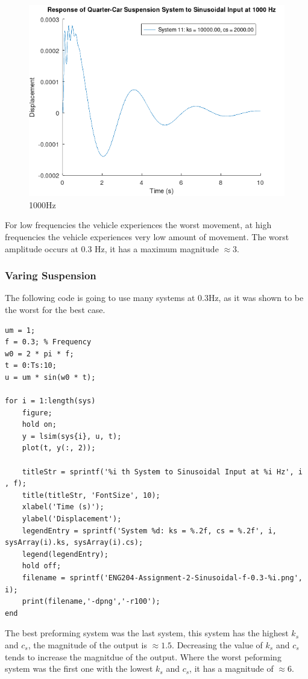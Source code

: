 \documentclass[11pt]{article}
\begin{document}
\begin{figure}[h]
    \centering
    \includegraphics[width=.9\linewidth]{ENG204-Assignment-2-Sinusoidal-f-1000.png}
    \caption{1000Hz}
    \label{fig:1000hz}
\end{figure}

For low frequencies the vehicle experiences the worst movement, at high frequencies the vehicle experiences very low amount of movement. The worst amplitude occurs at 0.3 Hz, it has a maximum magnitude \(\approx 3\).
\subsubsection{Varing Suspension}
\label{sec:org70c3b0a}
The following code is going to use many systems at 0.3Hz, as it was shown to be the worst for the best case.
\begin{verbatim}
um = 1;
f = 0.3; % Frequency
w0 = 2 * pi * f;
t = 0:Ts:10;
u = um * sin(w0 * t);

for i = 1:length(sys)
    figure;
    hold on;
    y = lsim(sys{i}, u, t);
    plot(t, y(:, 2));

    titleStr = sprintf('%i th System to Sinusoidal Input at %i Hz', i , f);
    title(titleStr, 'FontSize', 10);
    xlabel('Time (s)');
    ylabel('Displacement');
    legendEntry = sprintf('System %d: ks = %.2f, cs = %.2f', i, sysArray(i).ks, sysArray(i).cs);
    legend(legendEntry);
    hold off;
    filename = sprintf('ENG204-Assignment-2-Sinusoidal-f-0.3-%i.png', i);
    print(filename,'-dpng','-r100');
end
\end{verbatim}

The best preforming system was the last system, this system has the highest \(k_s\) and \(c_s\), the magnitude of the output is \(\approx 1.5\). Decreasing the value of \(k_s\) and \(c_s\) tends to increase the magnitdue of the output. Where the worst peforming system was the first one with the lowest  \(k_s\) and \(c_s\), it has a magnitude of \(\approx 6\).
\end{document}
